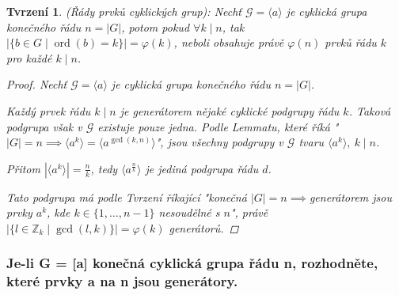 \documentclass[10pt,a4paper]{article}
\newtheorem{tvrzeni}{Tvrzení}
\newcommand{\Z}{{\mathbb{Z}}}       %
\DeclareMathOperator{\ord}{ord}
\begin{document}
\begin{tvrzeni} (Řády prvků cyklických grup): \normalfont
    Nechť $\mathcal{G}=\langle a \rangle$ je cyklická grupa konečného řádu $n=|G|$, potom pokud $\forall k \mid n$, tak $|\{b \in G \mid \ord(b) = k\}| = \varphi(k)$, neboli obsahuje právě $\varphi(n)$ prvků řádu $k$ pro každé $k\mid n$.
    \begin{proof}
        Nechť $\mathcal{G}=\langle a \rangle$ je cyklická grupa konečného řádu $n=|G|$. 
        
        Každý prvek řádu $k \mid n$ je generátorem nějaké cyklické podgrupy řádu $k$. 
        Taková podgrupa však v $\mathcal{G}$ existuje pouze jedna.
        Podle Lemmatu, které říká "$|G|=n \implies \langle a^k \rangle = \langle a^{\gcd(k,n)} \rangle$", jsou všechny podgrupy v $\mathcal{G}$ tvaru $\langle a^k \rangle, ~k \mid n$. 
        
        Přitom $|\langle a^k \rangle| = \frac nk$, tedy $\langle a^{\frac nk} \rangle$ je jediná podgrupa řádu $d$. 
        
        Tato podgrupa má podle Tvrzení říkající "konečná $|G|=n \implies$generátorem jsou prvky $a^k$, kde $k \in \{1, \dots, n-1\}$ nesoudělné s $n$", právě $|\{l \in \Z_k \mid \gcd(l,k)\}|=\varphi (k)$ generátorů.
    \end{proof}
\end{tvrzeni}

\subsubsection{Je-li G = [a] konečná cyklická grupa řádu n, rozhodněte, které prvky a na n jsou generátory.}
\end{document}
